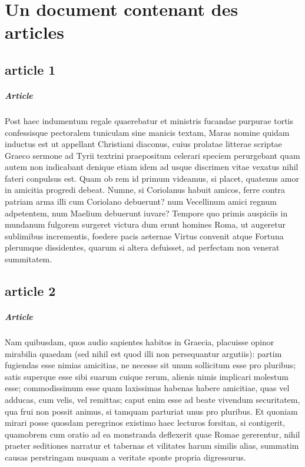 \documentclass[a4paper,11pt]{report}
\begin{document}
\chapter{Un document contenant des articles}
\section{article 1}
\paragraph{Article}Post haec indumentum regale quaerebatur et ministris fucandae purpurae tortis confessisque pectoralem tuniculam sine manicis textam, Maras nomine quidam inductus est ut appellant Christiani diaconus, cuius prolatae litterae scriptae Graeco sermone ad Tyrii textrini praepositum celerari speciem perurgebant quam autem non indicabant denique etiam idem ad usque discrimen vitae vexatus nihil fateri conpulsus est.
Quam ob rem id primum videamus, si placet, quatenus amor in amicitia progredi debeat. Numne, si Coriolanus habuit amicos, ferre contra patriam arma illi cum Coriolano debuerunt? num Vecellinum amici regnum adpetentem, num Maelium debuerunt iuvare?
Tempore quo primis auspiciis in mundanum fulgorem surgeret victura dum erunt homines Roma, ut augeretur sublimibus incrementis, foedere pacis aeternae Virtus convenit atque Fortuna plerumque dissidentes, quarum si altera defuisset, ad perfectam non venerat summitatem.
\section{article 2}
\paragraph{Article}Nam quibusdam, quos audio sapientes habitos in Graecia, placuisse opinor mirabilia quaedam (sed nihil est quod illi non persequantur argutiis): partim fugiendas esse nimias amicitias, ne necesse sit unum sollicitum esse pro pluribus; satis superque esse sibi suarum cuique rerum, alienis nimis implicari molestum esse; commodissimum esse quam laxissimas habenas habere amicitiae, quas vel adducas, cum velis, vel remittas; caput enim esse ad beate vivendum securitatem, qua frui non possit animus, si tamquam parturiat unus pro pluribus.
Et quoniam mirari posse quosdam peregrinos existimo haec lecturos forsitan, si contigerit, quamobrem cum oratio ad ea monstranda deflexerit quae Romae gererentur, nihil praeter seditiones narratur et tabernas et vilitates harum similis alias, summatim causas perstringam nusquam a veritate sponte propria digressurus.
\end{document}
